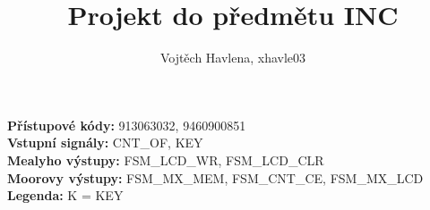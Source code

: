\documentclass[a4paper,12pt]{article}
\author{Vojtěch Havlena, xhavle03}
\title{Projekt do předmětu INC}
\date{}
\begin{document}
\maketitle
\noindent
\textbf{Přístupové kódy:} 913063032, 9460900851\\
\textbf{Vstupní signály:} CNT\_OF, KEY\\
\textbf{Mealyho výstupy:} FSM\_LCD\_WR, FSM\_LCD\_CLR\\
\textbf{Moorovy výstupy:} FSM\_MX\_MEM, FSM\_CNT\_CE, FSM\_MX\_LCD\\
\textbf{Legenda:} K = KEY
\begin{center}
\end{center}
\end{document}
